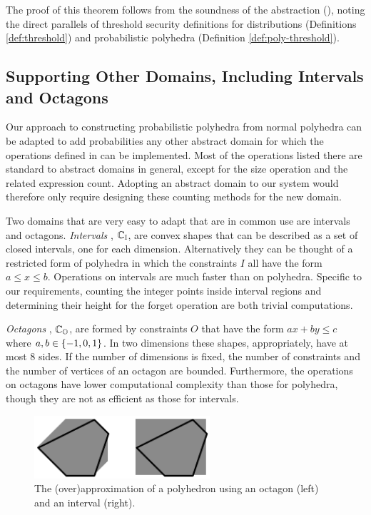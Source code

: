 The proof of this theorem follows from the soundness of the
abstraction (), noting the direct parallels of
threshold security definitions for distributions (Definitions
\ref{def:threshold}) and probabilistic polyhedra (Definition
\ref{def:poly-threshold}).

\subsection{Supporting Other Domains, Including Intervals and Octagons} \label{sec:simpler}

Our approach to constructing probabilistic polyhedra from normal
polyhedra can be adapted to add probabilities any other abstract
domain for which the operations defined in  can be
implemented.  Most of the operations listed there are standard to
abstract domains in general, except for the size operation and the
related expression count. Adopting an abstract domain to our system
would therefore only require designing these counting methods for the
new domain.

Two domains that are very easy to adapt that are in common use are
intervals and octagons.  \emph{Intervals} \cite{cousot76static},
$\mathbb{C_I}$, are convex shapes that can be described as a set of
closed intervals, one for each dimension. Alternatively they can be
thought of a restricted form of polyhedra in which the constraints $I$
all have the form $ a \leq x \leq b $. Operations on intervals are
much faster than on polyhedra. Specific to our requirements, counting
the integer points inside interval regions and determining their
height for the forget operation are both trivial computations.

\emph{Octagons} \cite{mine01octagon}, $\mathbb{C_O}$, are formed by
constraints $O$ that have the form $ a x + b y \leq c $ where $ a,b
\in \left\{ -1,0,1 \right\} $.  In two dimensions these shapes, appropriately,
have at most 8 sides. If the number of dimensions is fixed, the number
of constraints and the number of vertices of an octagon are
bounded. Furthermore, the operations on octagons have lower
computational complexity than those for polyhedra, though they are not
as efficient as those for intervals.

\begin{figure}
\begin{center}
\includegraphics[width=6.5cm]{figures/approx_domains.pdf} 
\end{center}
\caption{\label{fig:approx_domains} The (over)approximation of a polyhedron
  using an octagon (left) and an interval (right).}
\end{figure}

